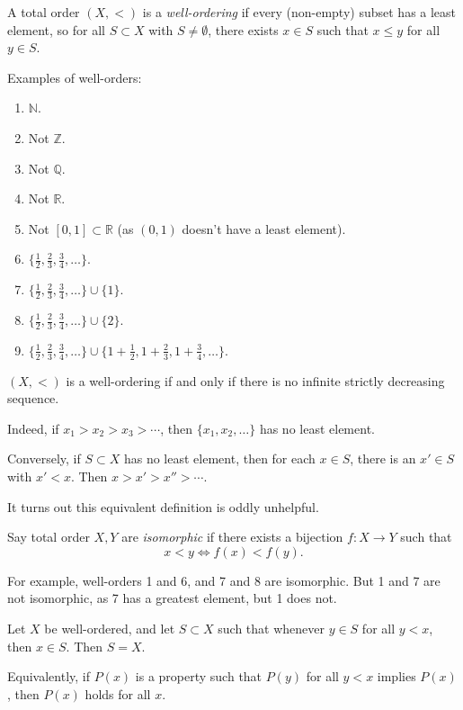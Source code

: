 \documentclass[12pt]{article}
\begin{document}
A total order $(X, <)$ is a \emph{well-ordering} if every (non-empty) subset has a least element, so for all $S \subset X$ with $S \neq \emptyset$, there exists $x \in S$ such that $x \leq y$ for all $y \in S$.

\begin{exbox}
	Examples of well-orders:
	\begin{enumerate}[1.]
		\item $\mathbb{N}$.
		\item Not $\mathbb{Z}$.
		\item Not $\mathbb{Q}$.
		\item Not $\mathbb{R}$.
		\item Not $[0,1] \subset \mathbb{R}$ (as $(0, 1)$ doesn't have a least element).
		\item $\{\frac{1}{2}, \frac{2}{3}, \frac{3}{4}, \ldots\}$.
		\item $\{\frac{1}{2}, \frac{2}{3}, \frac{3}{4}, \ldots\} \cup \{1\}$.
		\item $\{\frac{1}{2}, \frac{2}{3}, \frac{3}{4}, \ldots\}\cup \{2\}$.
		\item $\{\frac{1}{2}, \frac{2}{3}, \frac{3}{4}, \ldots\} \cup \{1 + \frac{1}{2},1 + \frac{2}{3},1 + \frac{3}{4}, \ldots\}$.
	\end{enumerate}
\end{exbox}

\begin{remark}
	$(X, <)$ is a well-ordering if and only if there is no infinite strictly decreasing sequence.

	Indeed, if $x_1 > x_2 > x_3 > \cdots$, then $\{x_1, x_2, \ldots\}$ has no least element.

	Conversely, if $S \subset X$ has no least element, then for each $x \in S$, there is an $x' \in S$ with $x' < x$. Then $x > x' > x'' > \cdots$.

	It turns out this equivalent definition is oddly unhelpful.
\end{remark}

Say total order $X, Y$ are \emph{isomorphic} if there exists a bijection $f : X \to Y$ such that
\[
x < y \iff f(x) < f(y)
.\]

For example, well-orders 1 and 6, and 7 and 8 are isomorphic. But 1 and 7 are not isomorphic, as 7 has a greatest element, but 1 does not.

\begin{proposition}
	Let $X$ be well-ordered, and let $S \subset X$ such that whenever $y \in S$ for all $y < x$, then $x \in S$. Then $S = X$.

	Equivalently, if $P(x)$ is a property such that $P(y)$ for all $y < x$ implies $P(x)$, then $P(x)$ holds for all $x$.
\end{proposition}
\end{document}
